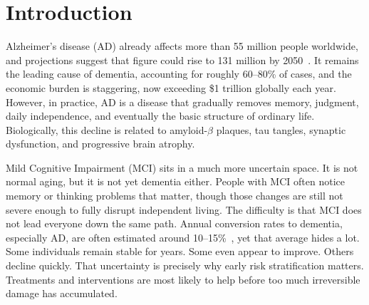 \documentclass[blue]{ludusofficial}  %
\begin{document}

\maketitle

\doublespacing

\section{Introduction}

Alzheimer's disease (AD) already affects more than 55 million people worldwide, and projections suggest that figure could rise to 131 million by 2050~\cite{hafeez2024deep}. It remains the leading cause of dementia, accounting for roughly 60--80\% of cases, and the economic burden is staggering, now exceeding \$1 trillion globally each year. However, in practice, AD is a disease that gradually removes memory, judgment, daily independence, and eventually the basic structure of ordinary life. Biologically, this decline is related to amyloid-$\beta$ plaques, tau tangles, synaptic dysfunction, and progressive brain atrophy.

Mild Cognitive Impairment (MCI) sits in a much more uncertain space. It is not normal aging, but it is not yet dementia either. People with MCI often notice memory or thinking problems that matter, though those changes are still not severe enough to fully disrupt independent living. The difficulty is that MCI does not lead everyone down the same path. Annual conversion rates to dementia, especially AD, are often estimated around 10--15\%~\cite{li2021predicting}, yet that average hides a lot. Some individuals remain stable for years. Some even appear to improve. Others decline quickly. That uncertainty is precisely why early risk stratification matters. Treatments and interventions are most likely to help before too much irreversible damage has accumulated.
\end{document}

